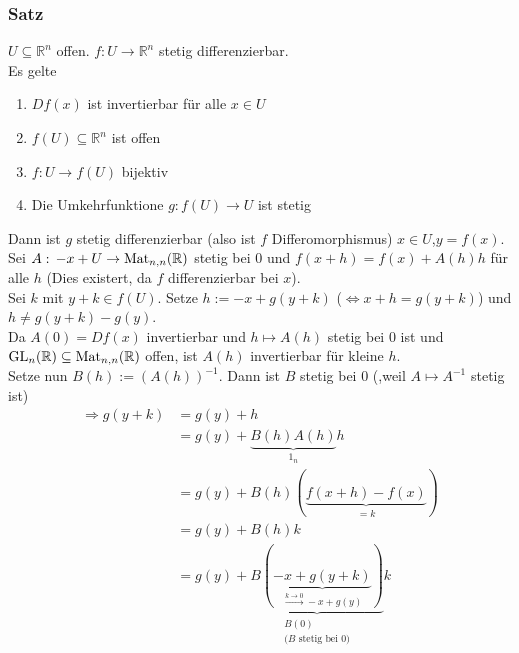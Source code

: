\subsubsection{Satz} %
\label{ssub:satz}
$ U \subseteq \mathbb{R}^n$ offen. $ f: U \to \mathbb{R}^n $ stetig differenzierbar. \\
Es gelte
\begin{enumerate}
	\item $Df(x)$ ist invertierbar für alle $x \in U$
	\item $f(U) \subseteq \mathbb{R}^n$ ist offen
	\item $f:U \to f(U)$ bijektiv
	\item Die Umkehrfunktione $g:f(U) \to U$ ist stetig
\end{enumerate}
Dann ist $g$ stetig differenzierbar (also ist $f$  Differomorphismus)
 $x \in U$,$y=f(x)$. Sei $A: \,-x+U \to \operatorname{Mat}_{n,n}(\mathbb{R})$ stetig bei $0$ und $f(x+h)=f(x)+A(h)h$ für alle $h$ (Dies existert, da $f$ differenzierbar bei $x$). \\
Sei $k$ mit $y+k \in f(U)$. Setze $h:= -x+g(y+k)$ ($\Leftrightarrow x+h=g(y+k)$) und $h \neq g(y+k)-g(y)$. \\
Da $A(0)=Df(x)$ invertierbar und $h \mapsto A(h)$ stetig bei $0$ ist und $\operatorname{GL}_n(\mathbb{R}) \subseteq \operatorname{Mat}_{n,n}(\mathbb{R})$ offen, ist $A(h)$ invertierbar für kleine $h$. \\
Setze nun $B(h):=(A(h))^{-1}$. Dann ist $B$ stetig bei $0$ (,weil $A \mapsto A^{-1}$ stetig ist)
\begin{align*}
	\Rightarrow g(y+k)&= g(y)+h \\
	&= g(y)+ \underset{1_n}{\underbrace{B(h)A(h)}}h \\
	&= g(y) + B(h)(\underset{=k}{\underbrace{f(x+h)-f(x)}}) \\
	&= g(y) + B(h)k \\
	&= g(y) + \underset{\substack{B(0) \\ \text{($B$ stetig bei $0$)}}}{\underbrace{B(\underset{\stackrel{k \to 0}{\longrightarrow}-x+g(y)}{\underbrace{-x+g(y+k)}})}}k
\end{align*} 
\bewende
	